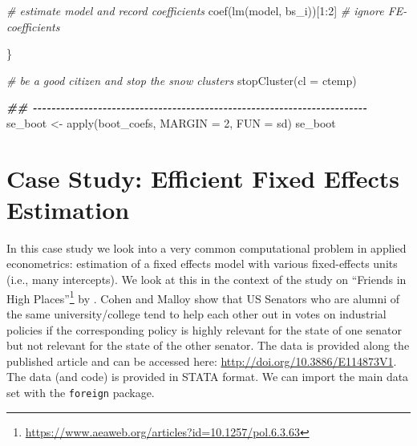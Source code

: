 \documentclass[
  12pt,
]{style/krantz}
\newenvironment{Shaded}{\begin{snugshade}}{\end{snugshade}}
\newcommand{\AttributeTok}[1]{\textcolor[rgb]{0.77,0.63,0.00}{#1}}
\newcommand{\CommentTok}[1]{\textcolor[rgb]{0.56,0.35,0.01}{\textit{#1}}}
\newcommand{\DecValTok}[1]{\textcolor[rgb]{0.00,0.00,0.81}{#1}}
\newcommand{\DocumentationTok}[1]{\textcolor[rgb]{0.56,0.35,0.01}{\textbf{\textit{#1}}}}
\newcommand{\FunctionTok}[1]{\textcolor[rgb]{0.00,0.00,0.00}{#1}}
\newcommand{\NormalTok}[1]{#1}
\newcommand{\OtherTok}[1]{\textcolor[rgb]{0.56,0.35,0.01}{#1}}
\newcommand{\SpecialCharTok}[1]{\textcolor[rgb]{0.00,0.00,0.00}{#1}}
\renewcommand{\href}[2]{#2\footnote{\url{#1}}}
\begin{document}
\begin{Shaded}
\begin{Highlighting}[]
    \CommentTok{\# estimate model and record coefficients}
    \FunctionTok{coef}\NormalTok{(}\FunctionTok{lm}\NormalTok{(model, bs\_i))[}\DecValTok{1}\SpecialCharTok{:}\DecValTok{2}\NormalTok{] }\CommentTok{\# ignore FE{-}coefficients}
    
\NormalTok{  \}}


\CommentTok{\# be a good citizen and stop the snow clusters}
\FunctionTok{stopCluster}\NormalTok{(}\AttributeTok{cl =}\NormalTok{ ctemp)}



\DocumentationTok{\#\# {-}{-}{-}{-}{-}{-}{-}{-}{-}{-}{-}{-}{-}{-}{-}{-}{-}{-}{-}{-}{-}{-}{-}{-}{-}{-}{-}{-}{-}{-}{-}{-}{-}{-}{-}{-}{-}{-}{-}{-}{-}{-}{-}{-}{-}{-}{-}{-}{-}{-}{-}{-}{-}{-}{-}{-}{-}{-}{-}{-}{-}{-}{-}{-}{-}{-}{-}{-}{-}{-}{-}{-}}
\NormalTok{se\_boot }\OtherTok{\textless{}{-}} \FunctionTok{apply}\NormalTok{(boot\_coefs, }
                 \AttributeTok{MARGIN =} \DecValTok{2}\NormalTok{,}
                 \AttributeTok{FUN =}\NormalTok{ sd)}
\NormalTok{se\_boot}
\end{Highlighting}
\end{Shaded}

\hypertarget{case-study-efficient-fixed-effects-estimation}{%
\section{Case Study: Efficient Fixed Effects Estimation}\label{case-study-efficient-fixed-effects-estimation}}

In this case study we look into a very common computational problem in applied econometrics: estimation of a fixed effects model with various fixed-effects units (i.e., many intercepts). We look at this in the context of the study on \href{https://www.aeaweb.org/articles?id=10.1257/pol.6.3.63}{``Friends in High Places''} by \citet{cohen_malloy}. Cohen and Malloy show that US Senators who are alumni of the same university/college tend to help each other out in votes on industrial policies if the corresponding policy is highly relevant for the state of one senator but not relevant for the state of the other senator. The data is provided along the published article and can be accessed here: \url{http://doi.org/10.3886/E114873V1}. The data (and code) is provided in STATA format. We can import the main data set with the \texttt{foreign} package.
\end{document}
